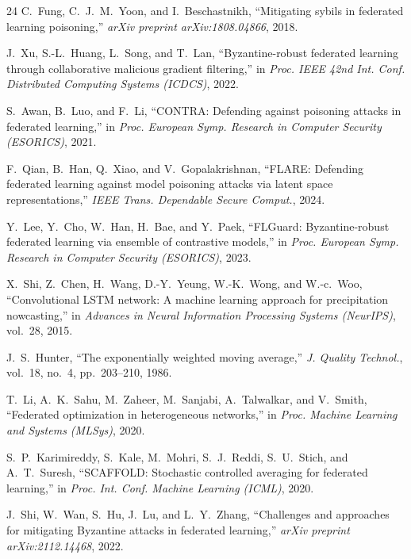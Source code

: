 \documentclass[journal]{IEEEtran}
\begin{document}
\begin{thebibliography}{24}
C.~Fung, C.~J.~M.~Yoon, and I.~Beschastnikh, ``Mitigating sybils in federated learning poisoning,'' \textit{arXiv preprint arXiv:1808.04866}, 2018.

J.~Xu, S.-L.~Huang, L.~Song, and T.~Lan, ``Byzantine-robust federated learning through collaborative malicious gradient filtering,'' in \textit{Proc. IEEE 42nd Int. Conf. Distributed Computing Systems (ICDCS)}, 2022.

S.~Awan, B.~Luo, and F.~Li, ``CONTRA: Defending against poisoning attacks in federated learning,'' in \textit{Proc. European Symp. Research in Computer Security (ESORICS)}, 2021.

F.~Qian, B.~Han, Q.~Xiao, and V.~Gopalakrishnan, ``FLARE: Defending federated learning against model poisoning attacks via latent space representations,'' \textit{IEEE Trans. Dependable Secure Comput.}, 2024.

Y.~Lee, Y.~Cho, W.~Han, H.~Bae, and Y.~Paek, ``FLGuard: Byzantine-robust federated learning via ensemble of contrastive models,'' in \textit{Proc. European Symp. Research in Computer Security (ESORICS)}, 2023.

X.~Shi, Z.~Chen, H.~Wang, D.-Y.~Yeung, W.-K.~Wong, and W.-c.~Woo, ``Convolutional LSTM network: A machine learning approach for precipitation nowcasting,'' in \textit{Advances in Neural Information Processing Systems (NeurIPS)}, vol.~28, 2015.

J.~S.~Hunter, ``The exponentially weighted moving average,'' \textit{J. Quality Technol.}, vol.~18, no.~4, pp.~203--210, 1986.

T.~Li, A.~K.~Sahu, M.~Zaheer, M.~Sanjabi, A.~Talwalkar, and V.~Smith, ``Federated optimization in heterogeneous networks,'' in \textit{Proc. Machine Learning and Systems (MLSys)}, 2020.

S.~P.~Karimireddy, S.~Kale, M.~Mohri, S.~J.~Reddi, S.~U.~Stich, and A.~T.~Suresh, ``SCAFFOLD: Stochastic controlled averaging for federated learning,'' in \textit{Proc. Int. Conf. Machine Learning (ICML)}, 2020.

J.~Shi, W.~Wan, S.~Hu, J.~Lu, and L.~Y.~Zhang, ``Challenges and approaches for mitigating Byzantine attacks in federated learning,'' \textit{arXiv preprint arXiv:2112.14468}, 2022.


\end{thebibliography}
\end{document}
